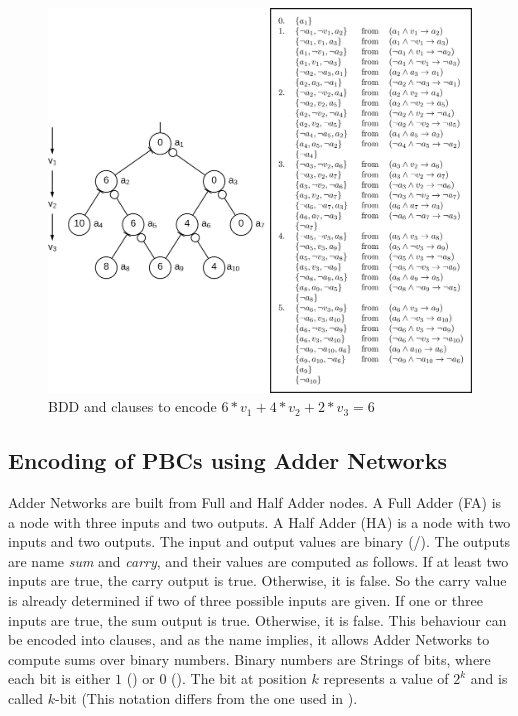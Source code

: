 \begin{figure}
\centering
\includegraphics[width=\textwidth]{Figures/BDDExampleComposition3.png}
\caption{BDD and clauses to encode $6*v_1+4*v_2+2*v_3=6$}
\label{fig:BDDExample}
\end{figure}

\clearpage
\subsection{Encoding of PBCs using Adder Networks}\label{PBCEncodingAdderNetworks}
Adder Networks are built from Full and Half Adder nodes. A Full Adder (FA) is a node with three inputs and two outputs. A Half Adder (HA) is a node with two inputs and two outputs. The input and output values are binary (\true{}/\false{}). The outputs are name \emph{sum} and \emph{carry}, and their values are computed as follows. If at least two inputs are true, the carry output is true. Otherwise, it is false. So the carry value is already determined if two of three possible inputs are given. If one or three inputs are true, the sum output is true. Otherwise, it is false. This behaviour can be encoded into clauses, and as the name implies, it allows Adder Networks to compute sums over binary numbers. Binary numbers are Strings of bits, where each bit is either $1$ (\true) or $0$ (\false). The bit at position $k$ represents a value of $2^k$ and is called $k$-bit (This notation differs from the one used in \cite{Een2006TranslatingPC}). \\

